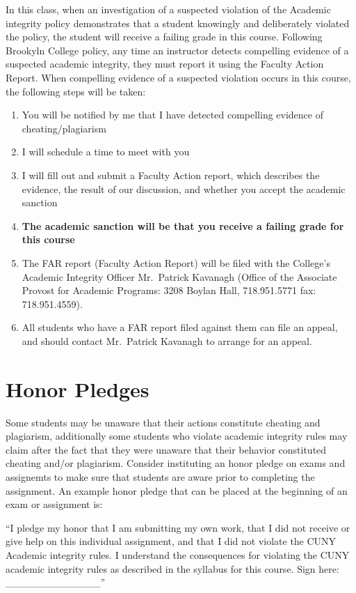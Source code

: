 \documentclass[]{book}
\providecommand{\tightlist}{%
  \setlength{\itemsep}{0pt}\setlength{\parskip}{0pt}}
\theoremstyle{definition}
\theoremstyle{definition}
\theoremstyle{definition}
\theoremstyle{remark}
\begin{document}
In this class, when an investigation of a suspected violation of the
Academic integrity policy demonstrates that a student knowingly and
deliberately violated the policy, the student will receive a failing
grade in this course. Following Brookyln College policy, any time an
instructor detects compelling evidence of a suspected academic
integrity, they must report it using the Faculty Action Report. When
compelling evidence of a suspected violation occurs in this course, the
following steps will be taken:

\begin{enumerate}
\def\labelenumi{\arabic{enumi}.}
\tightlist
\item
  You will be notified by me that I have detected compelling evidence of
  cheating/plagiarism
\item
  I will schedule a time to meet with you
\item
  I will fill out and submit a Faculty Action report, which describes
  the evidence, the result of our discussion, and whether you accept the
  academic sanction
\item
  \textbf{The academic sanction will be that you receive a failing grade
  for this course}
\item
  The FAR report (Faculty Action Report) will be filed with the
  College's Academic Integrity Officer Mr.~Patrick Kavanagh (Office of
  the Associate Provost for Academic Programs: 3208 Boylan Hall,
  718.951.5771 fax: 718.951.4559).
\item
  All students who have a FAR report filed against them can file an
  appeal, and should contact Mr.~Patrick Kavanagh to arrange for an
  appeal.
\end{enumerate}

\section{Honor Pledges}\label{honor-pledges}

Some students may be unaware that their actions constitute cheating and
plagiarism, additionally some students who violate academic integrity
rules may claim after the fact that they were unaware that their
behavior constituted cheating and/or plagiarism. Consider instituting an
honor pledge on exams and assignemts to make sure that students are
aware prior to completing the assignment. An example honor pledge that
can be placed at the beginning of an exam or assignment is:

``I pledge my honor that I am submitting my own work, that I did not
receive or give help on this individual assignment, and that I did not
violate the CUNY Academic integrity rules. I understand the consequences
for violating the CUNY academic integrity rules as described in the
syllabus for this course. Sign here: \_\_\_\_\_\_\_\_\_\_\_\_\_''
\end{document}

